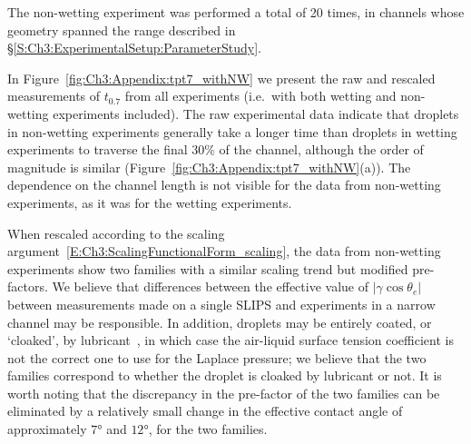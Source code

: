 \begin{subappendices}
The non-wetting experiment was performed a total of 20 times, in channels whose geometry spanned the range described in \S\ref{S:Ch3:ExperimentalSetup:ParameterStudy}.

In Figure~\ref{fig:Ch3:Appendix:tpt7_withNW} we present the raw and rescaled measurements of $t_{0.7}$ from all experiments (i.e.~with both wetting and non-wetting experiments included). The raw experimental data indicate that droplets in non-wetting experiments generally take a longer time than droplets in wetting experiments to traverse the final 30\% of the channel, although the order of magnitude is similar (Figure~\ref{fig:Ch3:Appendix:tpt7_withNW}(a)). The dependence on the channel length is not visible for the data from non-wetting experiments, as it was for the wetting experiments.

When rescaled according to the scaling argument~\eqref{E:Ch3:ScalingFunctionalForm_scaling}, the data from non-wetting experiments show two families with a similar scaling trend but modified pre-factors. We believe that differences between the effective value of $|\gamma \cos \theta_e|$ between measurements made on a single SLIPS and experiments in a narrow channel may be responsible. In addition, droplets may be entirely coated, or `cloaked', by lubricant~\citep{McHale2019Langmuir}, in which case the air-liquid surface tension coefficient is not the correct one to use for the Laplace pressure; we believe that the two families correspond to whether the droplet is cloaked by lubricant or not. It is worth noting that the discrepancy in the pre-factor of the two families can be eliminated by a relatively small change in the effective contact angle of approximately $7\si{\degree}$ and $12\si{\degree}$, for the two families.

\end{subappendices}
